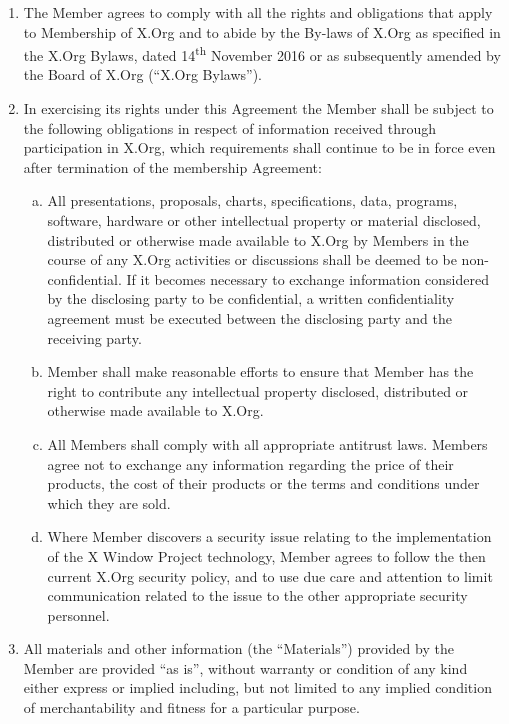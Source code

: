 \documentclass[10pt, english]{xorgdocs}
\newcommand\nth{\textsuperscript{th}\xspace} %
\begin{document}
\begin{enumerate}[(1)\hspace{.2cm}]
	\item The Member agrees to comply with all the rights and obligations
	that apply to Membership of X.Org and to abide by the By-laws of X.Org
	as specified in the X.Org Bylaws, dated 14\nth November 2016 or as
	subsequently amended by the Board of X.Org (``X.Org Bylaws'').

	\item In exercising its rights under this Agreement the Member shall be
	subject to the following obligations in respect of information received
	through participation in X.Org, which requirements shall continue to be
	in force even after termination of the membership Agreement:

	\begin{enumerate}[(a)\hspace{.2cm}]
		\item All presentations, proposals, charts, specifications,
		data, programs, software, hardware or other intellectual
		property or material disclosed, distributed or otherwise made
		available to X.Org by Members in the course of any X.Org
		activities or discussions shall be deemed to be non-confidential.
		If it becomes necessary to exchange information considered by
		the disclosing party to be confidential, a written
		confidentiality agreement must be executed between the
		disclosing party and the receiving party.

		\item Member shall make reasonable efforts to ensure that
		Member has the right to contribute any intellectual property
		disclosed, distributed or otherwise made available to X.Org.

		\item All Members shall comply with all appropriate antitrust
		laws. Members agree not to exchange any information regarding
		the price of their products, the cost of their products or
		the terms and conditions under which they are sold.

		\item Where Member discovers a security issue relating to the
		implementation of the X Window Project technology, Member agrees to
		follow the then current X.Org security policy, and to use due
		care and attention to limit communication related to the issue
		to the other appropriate security personnel.
	\end{enumerate}

	\item All materials and other information (the ``Materials'') provided
	by the Member are provided ``as is'', without warranty or condition of
	any kind either express or implied including, but not limited to any
	implied condition of merchantability and fitness for a particular
	purpose.


\end{enumerate}
\end{document}
